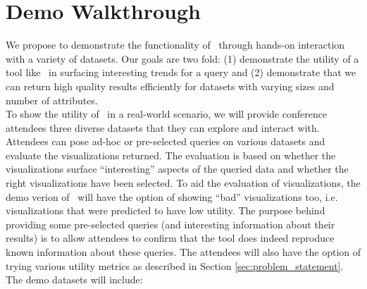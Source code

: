 
\section{Demo Walkthrough}
\label{demo-walkthrough}
 
We propose to demonstrate the functionality of \SeeDB\ through hands-on
interaction with a variety of datasets. Our goals are two fold: (1) demonstrate
the utility of a tool like \SeeDB\ in surfacing interesting trends for a query
and (2) demonstrate that we can return high quality results efficiently for
datasets with varying sizes and number of attributes.\\

 To show the utility of \SeeDB\ in a real-world
scenario, we will provide conference attendees three diverse datasets that they
can explore and interact with. Attendees can pose ad-hoc or pre-selected queries
on various datasets and evaluate the visualizations returned. The
evaluation is based on whether the visualizations surface ``interesting''
aspects of the queried data and whether the right visualizations have been
selected. To aid the evaluation of visualizations, the demo verion of \SeeDB\
will have the option of showing ``bad'' visualizations too, i.e. visualizations
that were predicted to have low utility. The purpose behind providing some
pre-selected queries (and interesting information about their results) is to
allow attendees to confirm that the tool does indeed reproduce known
information about these queries. The attendees will also have the option of
trying various utility metrics as described in Section
\ref{sec:problem_statement}. The demo datasets will include:
 
